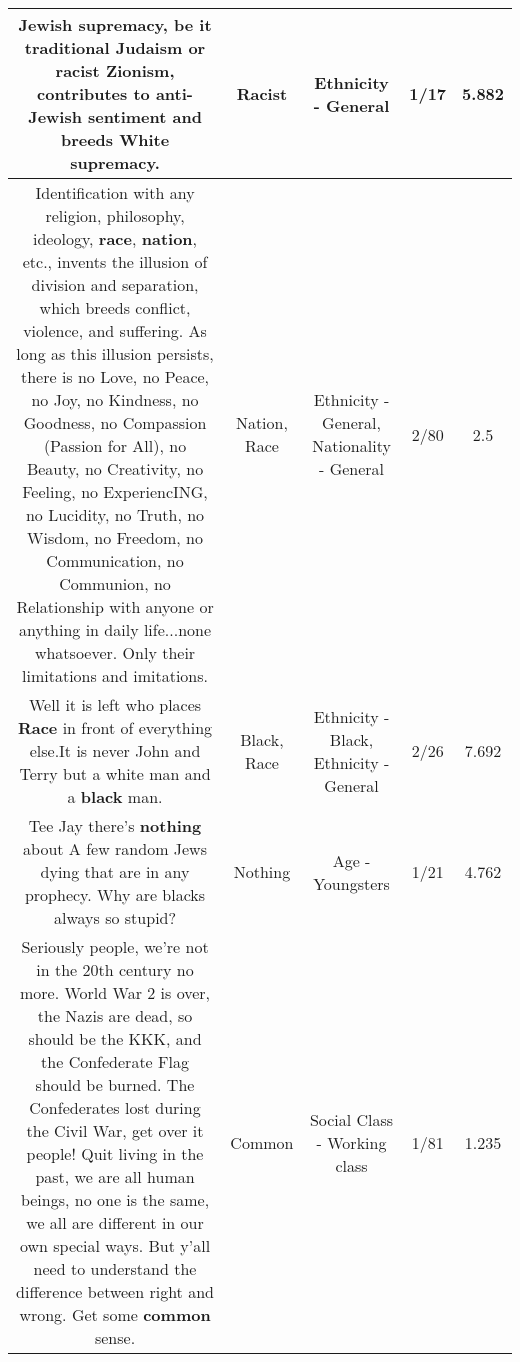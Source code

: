 \documentclass[11pt]{article}
\newlength\mylength
\begin{document}
\begin{center}
\begin{longtable}{|C{.65\mylength}|C{.30\mylength}|C{.12\mylength}|C{.12\mylength}|C{.12\mylength}|}
  \small Jewish supremacy, be it traditional Judaism or \textbf{racist} Zionism, contributes to anti-Jewish sentiment and breeds White supremacy.\normalsize   & Racist & Ethnicity - General & 1/17 & 5.882 \\  \hline
  \small Identification with any religion, philosophy, ideology, \textbf{race}, \textbf{nation}, etc., invents the illusion of division and separation, which breeds conflict, violence, and suffering. As long as this illusion persists, there is no Love, no Peace, no Joy, no Kindness, no Goodness, no Compassion (Passion for All), no Beauty, no Creativity, no Feeling, no ExperiencING, no Lucidity, no Truth, no Wisdom, no Freedom, no Communication, no Communion, no Relationship with anyone or anything in daily life...none whatsoever. Only their limitations and imitations.\normalsize   & Nation, Race & Ethnicity - General, Nationality - General & 2/80 & 2.5 \\  \hline
  \small Well it is left who places \textbf{Race} in front of everything else.It is never John and Terry but a white man and a \textbf{black} man.\normalsize   & Black, Race & Ethnicity - Black, Ethnicity - General & 2/26 & 7.692 \\  \hline
  \small Tee Jay there's \textbf{nothing} about A few random Jews dying that are in any prophecy. Why are blacks always so stupid?\normalsize   & Nothing & Age - Youngsters & 1/21 & 4.762 \\  \hline
  \small Seriously people, we're not in the 20th century no more. World War 2 is over, the Nazis are dead, so should be the KKK, and the Confederate Flag should be burned. The Confederates lost during the Civil War, get over it people! Quit living in the past, we are all human beings, no one is the same, we all are different in our own special ways. But y'all need to understand the difference between right and wrong. Get some \textbf{common} sense.\normalsize   & Common & Social Class - Working class & 1/81 & 1.235 \\  \hline

\end{longtable}
\end{center}
\end{document}
